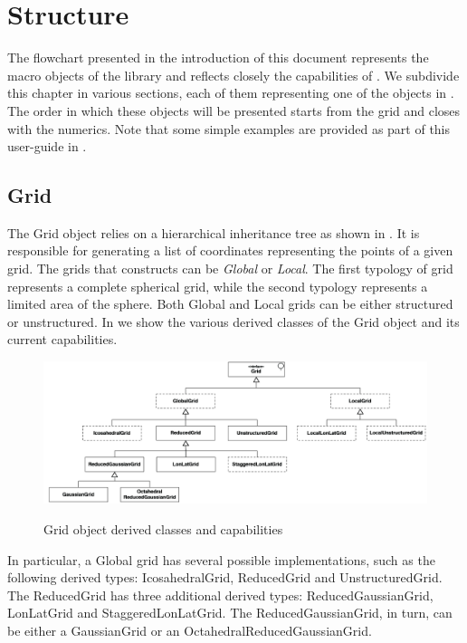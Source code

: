 \chapter{Structure}
\label{chap:structure}
The flowchart presented in the introduction of this document 
represents the macro objects of the library and reflects 
closely the capabilities of \Atlas. We subdivide this 
chapter in various sections, each of them representing one 
of the objects in . The order in 
which these objects will be presented starts from the grid 
and closes with the numerics. Note that some simple examples 
are provided as part of this user-guide in .



\section{Grid}
The Grid object relies on a hierarchical inheritance tree 
as shown in . It is responsible for generating 
a list of coordinates representing the points of a given grid. 
The grids that \Atlas constructs can be \textit{Global} or 
\textit{Local}. The first typology of grid represents a complete 
spherical grid, while the second typology represents a limited 
area of the sphere. Both Global and Local grids can be either 
structured or unstructured. In  we show the 
various derived classes of the Grid object and its current 
capabilities.
%
\begin{figure}[htb]
\centering
\includegraphics[scale=0.3]{imgs/grids.png}
\label{fig:grids}
\caption{Grid object derived classes and capabilities}
\end{figure}
%
In particular, a Global grid has several possible implementations, 
such as the following derived types: IcosahedralGrid, ReducedGrid 
and UnstructuredGrid. The ReducedGrid has three additional derived 
types: ReducedGaussianGrid, LonLatGrid and StaggeredLonLatGrid.
The ReducedGaussianGrid, in turn, can be either a GaussianGrid 
or an OctahedralReducedGaussianGrid.


